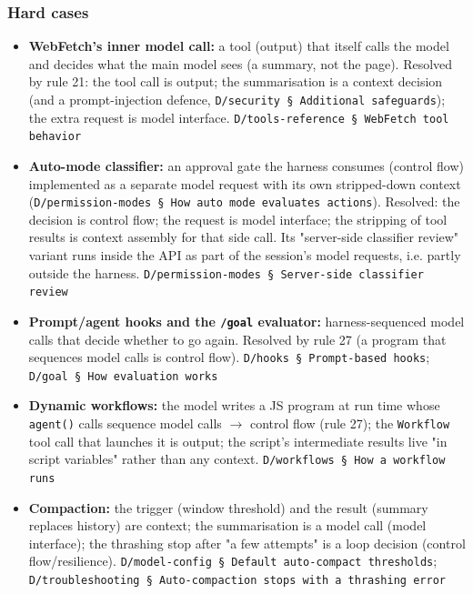 \subsubsection*{Hard cases}
\begin{itemize}
\item \textbf{WebFetch's inner model call:} a tool (output) that itself calls the model and decides what the main model sees (a summary, not the page). Resolved by rule 21: the tool call is output; the summarisation is a context decision (and a prompt-injection defence, \texttt{D/\allowbreak{}security § Additional safeguards}); the extra request is model interface. \texttt{D/\allowbreak{}tools-\allowbreak{}reference § WebFetch tool behavior}
\item \textbf{Auto-mode classifier:} an approval gate the harness consumes (control flow) implemented as a separate model request with its own stripped-down context (\texttt{D/\allowbreak{}permission-\allowbreak{}modes § How auto mode evaluates actions}). Resolved: the decision is control flow; the request is model interface; the stripping of tool results is context assembly for that side call. Its "server-side classifier review" variant runs inside the API as part of the session's model requests, i.e. partly outside the harness. \texttt{D/\allowbreak{}permission-\allowbreak{}modes § Server-\allowbreak{}side classifier review}
\item \textbf{Prompt/agent hooks and the \texttt{/\allowbreak{}goal} evaluator:} harness-sequenced model calls that decide whether to go again. Resolved by rule 27 (a program that sequences model calls is control flow). \texttt{D/\allowbreak{}hooks § Prompt-\allowbreak{}based hooks}; \texttt{D/\allowbreak{}goal § How evaluation works}
\item \textbf{Dynamic workflows:} the model writes a JS program at run time whose \texttt{agent(\allowbreak{})} calls sequence model calls $\rightarrow$ control flow (rule 27); the \texttt{Workflow} tool call that launches it is output; the script's intermediate results live "in script variables" rather than any context. \texttt{D/\allowbreak{}workflows § How a workflow runs}
\item \textbf{Compaction:} the trigger (window threshold) and the result (summary replaces history) are context; the summarisation is a model call (model interface); the thrashing stop after "a few attempts" is a loop decision (control flow/resilience). \texttt{D/\allowbreak{}model-\allowbreak{}config § Default auto-\allowbreak{}compact thresholds}; \texttt{D/\allowbreak{}troubleshooting § Auto-\allowbreak{}compaction stops with a thrashing error}

\end{itemize}
